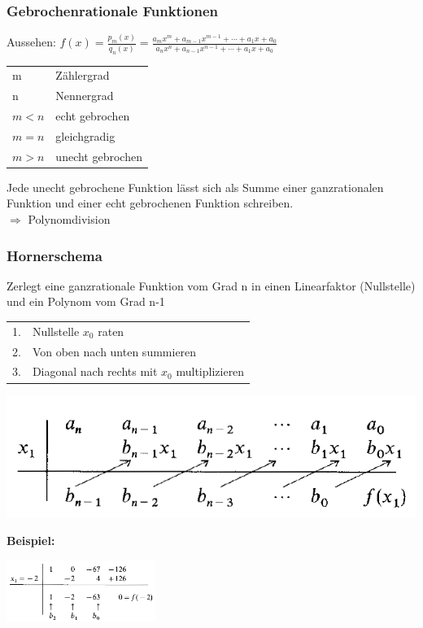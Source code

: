 		\subsubsection{Gebrochenrationale Funktionen}
			Aussehen: $f(x)=\frac{p_m(x)}{q_n(x)}=\frac{a_mx^{m}+a_{m-1}x^{m-1}+\cdots+a_1x+a_0}{a_nx^{n}+a_{n-1}x^{n-1}+\cdots+a_1x+a_0}$ \\
			
			\begin{tabular}{ll} 
				m & Zählergrad \\
				n & Nennergrad \\
				$m < n$ & echt gebrochen \\
				$m = n$ & gleichgradig \\
				$m > n$ & unecht gebrochen \\ 
			\end{tabular}	
		
			Jede unecht gebrochene Funktion lässt sich als Summe einer ganzrationalen Funktion und einer echt gebrochenen Funktion schreiben. \\
			$\Rightarrow$ Polynomdivision \\

		\subsubsection{Hornerschema}
			Zerlegt eine ganzrationale Funktion vom Grad n in einen Linearfaktor (Nullstelle) und ein Polynom vom Grad n-1 \\
			
			\begin{tabular}{ll}
				1. & Nullstelle $x_0$ raten \\
				2. & Von oben nach unten summieren \\
				3. & Diagonal nach rechts mit $x_0$ multiplizieren \\
			\end{tabular}	
			
			\includegraphics[width=0.7\linewidth]{Bilder/hornerschema_allg}
					
			\textbf{Beispiel:}
			
			\includegraphics[height=2cm]{Bilder/hornerschema_bsp}

